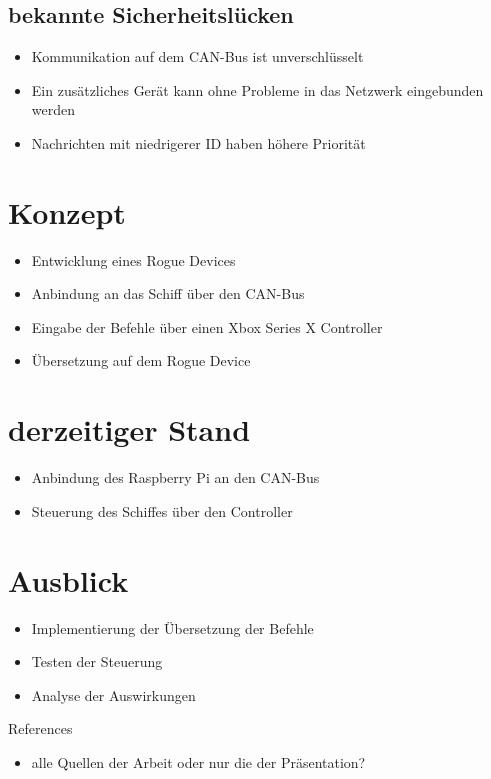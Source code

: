 \documentclass[usenames, dvipsnames, aspectratio=75]{beamer}
\begin{document}
\subsection{bekannte Sicherheitslücken}
\begin{frame}
    \begin{itemize}
        \item Kommunikation auf dem CAN-Bus ist unverschlüsselt
        \item Ein zusätzliches Gerät kann ohne Probleme in das Netzwerk eingebunden werden
        \item Nachrichten mit niedrigerer ID haben höhere Priorität
    \end{itemize}
\end{frame}

\section{Konzept}
\begin{frame}
    \begin{itemize}
        \item Entwicklung eines Rogue Devices
        \item Anbindung an das Schiff über den CAN-Bus 
        \item Eingabe der Befehle über einen Xbox Series X Controller
        \item Übersetzung auf dem Rogue Device
    \end{itemize}
\end{frame}

\section{derzeitiger Stand}
\begin{frame}
    \begin{itemize}
        \item Anbindung des Raspberry Pi an den CAN-Bus
        \item Steuerung des Schiffes über den Controller
    \end{itemize}
\end{frame}

\section{Ausblick}
\begin{frame}
    \begin{itemize}
        \item Implementierung der Übersetzung der Befehle
        \item Testen der Steuerung
        \item Analyse der Auswirkungen
    \end{itemize}
\end{frame}


\begin{frame}[allowframebreaks]{References}
    \printbibliography[heading=none]
    \begin{itemize}
        \item alle Quellen der Arbeit oder nur die der Präsentation?
    \end{itemize}
\end{frame}
\end{document}
